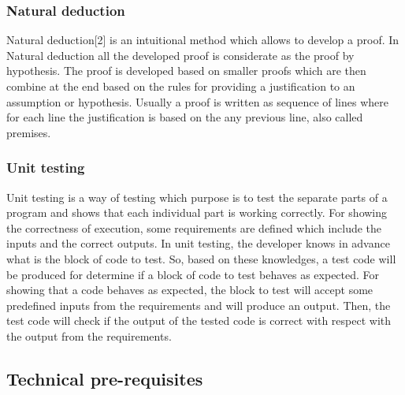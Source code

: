 \documentclass[conference,compsoc]{IEEEtran}
\begin{document}
\subsubsection{Natural deduction}
Natural deduction[2] is an intuitional method which allows to develop a proof. In Natural deduction all the developed proof is considerate as the proof by hypothesis. The proof is developed based on smaller proofs which are then combine at the end based on the rules for providing a justification to an assumption or hypothesis. Usually a proof is written as sequence of lines where for each line the justification is based on the any previous line, also called premises. 

\subsubsection{Unit testing}
Unit testing is a way of testing which purpose is to test the separate parts of a program and shows that each individual part is working correctly. For showing the correctness of execution, some requirements are defined which include the inputs and the correct outputs. In unit testing, the developer knows in advance what is the block of code to test. So, based on these knowledges, a test code will be produced for determine if a block of code to test behaves as expected. For showing that a code behaves as expected, the block to test will accept some predefined inputs from the requirements and will produce an output. Then, the test code will check if the output of the tested code is correct with respect with the output from the requirements.   

\subsection{Technical pre-requisites}
\end{document}
